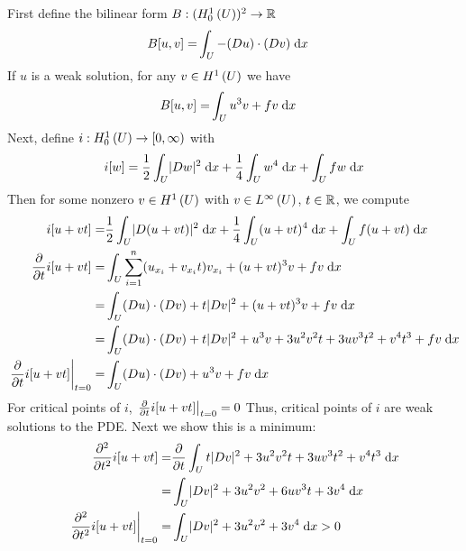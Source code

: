 First define the bilinear form $B: (H_0^{1}\left(U \right))^2 \rightarrow \mathbb{R}$
\begin{align*}
  B[u, v] = &\int_{U} -(D u) \cdot (D v) \;\mathrm{d}x
\end{align*}
If $u$ is a weak solution, for any $v \in H^{1}\left(U \right)$ we have
\begin{align*}
  B[u, v] = &\int_{U} u^3 v + f v \;\mathrm{d}x
\end{align*}
Next, define $i: H_0^{1}\left(U \right) \rightarrow [0, \infty)$ with
\begin{align*}
  i[w] = \frac{1}{2} \int_U \lvert D w\lvert^2 \;\mathrm{d}x
         + \frac{1}{4} \int_U w^4 \;\mathrm{d}x
         + \int_U f w \;\mathrm{d}x
\end{align*}
Then for some nonzero $v \in H^{1}\left(U \right)$ with $v \in L^{\infty}\left(U \right)$, $t \in \mathbb{R}$,
we compute
\begin{align*}
  i[u + v t] = &\frac{1}{2} \int_U \lvert D (u + v t)\rvert^2 \;\mathrm{d}x
                + \frac{1}{4} \int_U (u + v t)^4 \;\mathrm{d}x
                + \int_U f (u + v t) \;\mathrm{d}x\\
  \frac{\partial }{\partial t} i[u + v t]
             = &\int_U \sum_{i = 1}^n (u_{x_i} + v_{x_i} t) v_{x_i}
                + (u + v t)^3 v + f v \;\mathrm{d}x\\
             = &\int_U (D u) \cdot (D v) + t \lvert D v \rvert^2
                + (u + v t)^3 v + f v \;\mathrm{d}x\\
             = &\int_U (D u) \cdot (D v) + t \lvert D v \rvert^2
                + u^3 v + 3 u^2 v^2 t + 3 u v^3 t^2 + v^4 t^3 + f v \;\mathrm{d}x\\
  \left. \frac{\partial }{\partial t} i[u + v t] \right \rvert_{t = 0}
             = &\int_U (D u) \cdot (D v) + u^3 v + f v \;\mathrm{d}x
\end{align*}
For critical points of $i$, $\left. \frac{\partial }{\partial t} i[u + v t] \right \rvert_{t = 0} = 0$
Thus, critical points of $i$ are weak solutions to the PDE.
Next we show this is a minimum:
\begin{align*}
  \frac{\partial^{2} }{\partial t^{2}} i[u + v t]
    = &\frac{\partial }{\partial t} \int_U t \lvert D v \rvert^2
                                + 3 u^2 v^2 t + 3 u v^3 t^2 + v^4 t^3 \;\mathrm{d}x\\
    = & \int_U \lvert D v \rvert^2 + 3 u^2 v^2 + 6 u v^3 t + 3 v^4 \;\mathrm{d}x\\
  \left. \frac{\partial^{2} }{\partial t^{2}} i[u + v t] \right\rvert_{t = 0}
    = &\int_U \lvert D v \rvert^2 + 3 u^2 v^2 + 3 v^4 \;\mathrm{d}x > 0
\end{align*}
